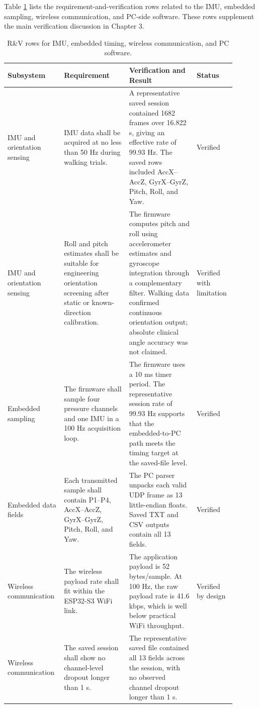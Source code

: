 Table \ref{tab:rv_software_rows} lists the requirement-and-verification rows related to the IMU, embedded sampling, wireless communication, and PC-side software. These rows supplement the main verification discussion in Chapter 3.

\begin{table}[p]
\centering
\caption{R\&V rows for IMU, embedded timing, wireless communication, and PC software.}
\label{tab:rv_software_rows}
\begin{tabular}{|p{0.20\linewidth}|p{0.27\linewidth}|p{0.29\linewidth}|p{0.14\linewidth}|}
\hline
\textbf{Subsystem} & \textbf{Requirement} & \textbf{Verification and Result} & \textbf{Status} \\
\hline
IMU and orientation sensing
& IMU data shall be acquired at no less than 50 Hz during walking trials.
& A representative saved session contained 1682 frames over 16.822 s, giving an effective rate of 99.93 Hz. The saved rows included AccX--AccZ, GyrX--GyrZ, Pitch, Roll, and Yaw.
& Verified \\
\hline
IMU and orientation sensing
& Roll and pitch estimates shall be suitable for engineering orientation screening after static or known-direction calibration.
& The firmware computes pitch and roll using accelerometer estimates and gyroscope integration through a complementary filter. Walking data confirmed continuous orientation output; absolute clinical angle accuracy was not claimed.
& Verified with limitation \\
\hline
Embedded sampling
& The firmware shall sample four pressure channels and one IMU in a 100 Hz acquisition loop.
& The firmware uses a 10 ms timer period. The representative session rate of 99.93 Hz supports that the embedded-to-PC path meets the timing target at the saved-file level.
& Verified \\
\hline
Embedded data fields
& Each transmitted sample shall contain P1--P4, AccX--AccZ, GyrX--GyrZ, Pitch, Roll, and Yaw.
& The PC parser unpacks each valid UDP frame as 13 little-endian floats. Saved TXT and CSV outputs contain all 13 fields.
& Verified \\
\hline
Wireless communication
& The wireless payload rate shall fit within the ESP32-S3 WiFi link.
& The application payload is 52 bytes/sample. At 100 Hz, the raw payload rate is 41.6 kbps, which is well below practical WiFi throughput.
& Verified by design \\
\hline
Wireless communication
& The saved session shall show no channel-level dropout longer than 1 s.
& The representative saved file contained all 13 fields across the session, with no observed channel dropout longer than 1 s.

\end{tabular}
\end{table}
